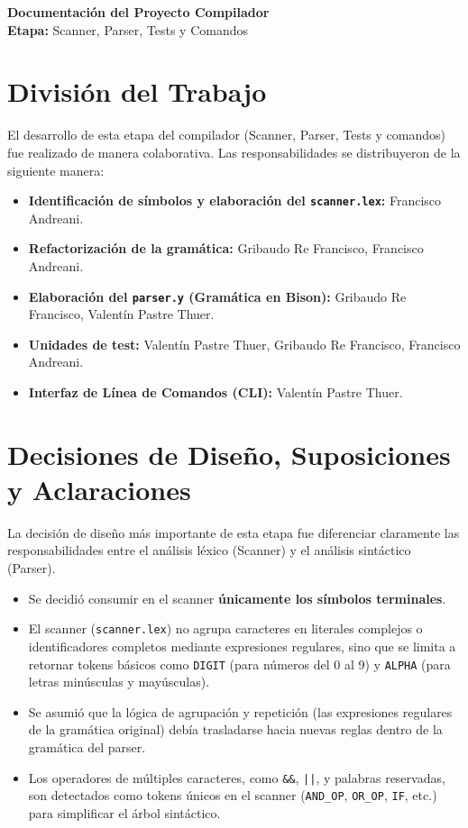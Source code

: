 \documentclass[11pt, a4paper]{article}
\begin{document}
\begin{center}
    {\LARGE \textbf{\textcolor{primary}{Documentación del Proyecto Compilador}}} \\
    \vspace{0.5cm}
    {\large \textbf{Etapa:} Scanner, Parser, Tests y Comandos}
\end{center}
\vspace{0.8cm}

\section{División del Trabajo}
El desarrollo de esta etapa del compilador (Scanner, Parser, Tests y comandos) fue realizado de manera colaborativa. Las responsabilidades se distribuyeron de la siguiente manera:

\begin{itemize}
    \item \textbf{Identificación de símbolos y elaboración del \texttt{scanner.lex}:} Francisco Andreani.
    \item \textbf{Refactorización de la gramática:} Gribaudo Re Francisco, Francisco Andreani.
    \item \textbf{Elaboración del \texttt{parser.y} (Gramática en Bison):} Gribaudo Re Francisco, Valentín Pastre Thuer.
    \item \textbf{Unidades de test:} Valentín Pastre Thuer, Gribaudo Re Francisco, Francisco Andreani.
    \item \textbf{Interfaz de Línea de Comandos (CLI):} Valentín Pastre Thuer.
\end{itemize}

\section{Decisiones de Diseño, Suposiciones y Aclaraciones}
La decisión de diseño más importante de esta etapa fue diferenciar claramente las responsabilidades entre el análisis léxico (Scanner) y el análisis sintáctico (Parser).

\begin{itemize}
    \item Se decidió consumir en el scanner \textbf{únicamente los símbolos terminales}.
    \item El scanner (\texttt{scanner.lex}) no agrupa caracteres en literales complejos o identificadores completos mediante expresiones regulares, sino que se limita a retornar tokens básicos como \texttt{DIGIT} (para números del 0 al 9) y \texttt{ALPHA} (para letras minúsculas y mayúsculas).
    \item Se asumió que la lógica de agrupación y repetición (las expresiones regulares de la gramática original) debía trasladarse hacia nuevas reglas dentro de la gramática del parser.
    \item Los operadores de múltiples caracteres, como \texttt{\&\&}, \texttt{||}, y palabras reservadas, son detectados como tokens únicos en el scanner (\texttt{AND\_OP}, \texttt{OR\_OP}, \texttt{IF}, etc.) para simplificar el árbol sintáctico.
\end{itemize}
\end{document}
